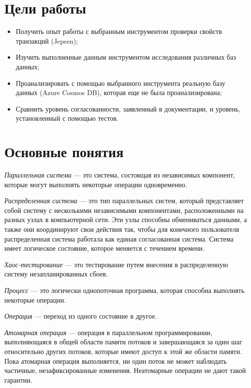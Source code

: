 \documentclass[14pt,  openany]{book}
\begin{document}
\section{Цели работы}
\begin{itemize}
  \item Получить опыт работы с выбранным инструментом проверки свойств транзакций (Jepsen);
  \item Изучить выполненные данным инструментом исследования различных баз данных;
  \item Проанализировать с помощью выбранного инструмента реальную базу данных (Azure Cosmos DB), которая еще не была проанализирована;
  \item Сравнить уровень согласованности, заявленный в документации, и уровень, установленный с помощью тестов.
\end{itemize}

\section{Основные понятия}

\emph{Параллельная система} --- это система, состоящая из независимых компонент, которые могут выполнять некоторые операции одновременно.

\emph{Распределенная система} --- это тип параллельных систем, который представляет собой систему с несколькими независимыми компонентами, расположенными на разных узлах в компьютерной сети. Эти узлы способны обмениваться данными, а также они координируют свои действия так, чтобы для конечного пользователя распределенная система работала как единая согласованная система. Система имеет логическое состояние, которое меняется с течением времени.

\emph{Хаос-тестирование \cite{chaosTesting}} --- это тестирование путем внесения в распределенную систему незапланированных сбоев.

\emph{Процесс} --- это логически однопоточная программа, которая способна выполнять некоторые операции.

\emph{Операция} --- переход из одного состояние в другое.

\emph{Атомарная операция} --- \cite{habrAtomicOperation} операция в параллельном программировании, выполняющаяся в общей области памяти потоков и завершающаяся за один шаг относительно других потоков, которые имеют доступ к этой же области памяти.  Пока атомарная операция выполняется, ни один поток не может наблюдать частичные, незафиксированные изменения. Неатомарные операции не дают такой гарантии. 
\end{document}
